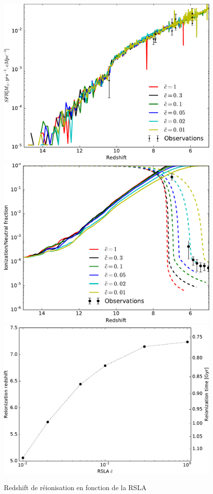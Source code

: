 \begin{figure}
        \includegraphics[height=.3\textheight]{img/04_mapreio/SFR.pdf} 
        \includegraphics[height=.3\textheight]{img/04_mapreio/xion.pdf} 
        \includegraphics[height=.3\textheight]{img/04_mapreio/z_rsla.pdf} 
        \caption[Redshift de réionisation en fonction de la RSLA]{Redshift de réionisation en fonction de la RSLA
 		\label{fig:zrsla}}
\end{figure}

